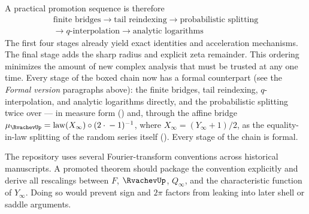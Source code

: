 \documentclass[11pt,oneside]{article}
\numberwithin{equation}{section}
\theoremstyle{definition}
\theoremstyle{remark}
\begin{document}
A practical promotion sequence is therefore
\[
 \boxed{\begin{gathered}
 \text{finite bridges}
 \longrightarrow \text{tail reindexing}
 \longrightarrow \text{probabilistic splitting}\\
 \longrightarrow \text{$q$-interpolation}
 \longrightarrow \text{analytic logarithms}
 \end{gathered}}
\]
The first four stages already yield exact identities and acceleration mechanisms.  The final
stage adds the sharp radius and explicit zeta remainder.  This ordering minimizes the amount
of new complex analysis that must be trusted at any one time.  Every stage of the boxed
chain now has a formal counterpart (see the \emph{Formal version} paragraphs above): the
finite bridges, tail reindexing, $q$-interpolation, and analytic logarithms directly, and
the probabilistic splitting twice over --- in measure form
() and, through the affine bridge
\(\mu_{\RvachevUp}=\operatorname{law}(X_\infty)\circ(2\cdot{}-1)^{-1}\), where
\(X_\infty=(Y_\infty+1)/2\), as the equality-in-law
splitting of the random series itself ().  Every stage of the
chain is formal.

\begin{obligation}
The repository uses several Fourier-transform conventions across historical manuscripts.
A promoted theorem should package the convention explicitly and derive all rescalings between
$F$, $\RvachevUp$, $Q_\infty$, and the characteristic function of $Y_\infty$.  Doing so would prevent
sign and $2\pi$ factors from leaking into later shell or saddle arguments.
\end{obligation}
\end{document}

